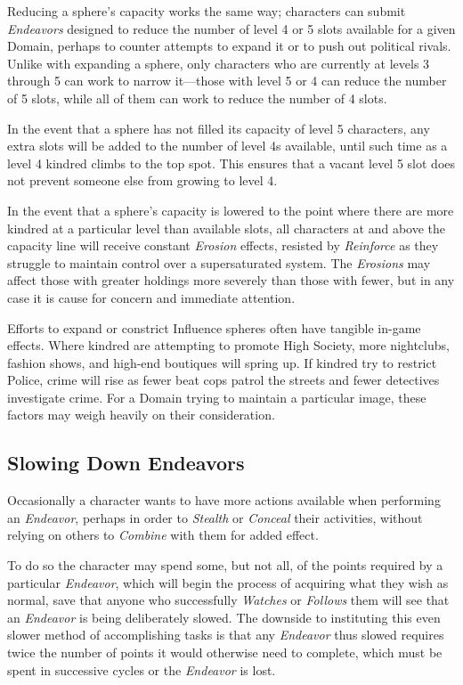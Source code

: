 Reducing a sphere's capacity works the same way; characters can submit \emph{Endeavors} designed to reduce the 
number of level 4 or 5 slots available for a given Domain, perhaps to counter attempts to expand it or to push out 
political rivals.  Unlike with expanding a sphere, only characters who are currently at levels 3 through 5 can work 
to narrow it---those with level 5 or 4 can reduce the number of 5 slots, while all of them can work to reduce the 
number of 4 slots.

In the event that a sphere has not filled its capacity of level 5 characters, any extra slots will be added to the number 
of level 4s available, until such time as a level 4 kindred climbs to the top spot.  This ensures that a vacant level 5 
slot does not prevent someone else from growing to level 4.

In the event that a sphere's capacity is lowered to the point where there are more kindred at a particular level than 
available slots, all characters at and above the capacity line will receive constant \emph{Erosion} effects, resisted 
by \emph{Reinforce} as they struggle to maintain control over a supersaturated system.  The \emph{Erosions} may affect 
those with greater holdings more severely than those with fewer, but in any case it is cause for concern and immediate 
attention.

Efforts to expand or constrict Influence spheres often have tangible in-game effects.  Where kindred are attempting 
to promote High Society, more nightclubs, fashion shows, and high-end boutiques will spring up.  If kindred try to 
restrict Police, crime will rise as fewer beat cops patrol the streets and fewer detectives investigate crime.  For a 
Domain trying to maintain a particular image, these factors may weigh heavily on their consideration.

\subsection{Slowing Down Endeavors}
Occasionally a character wants to have more actions available when performing an \emph{Endeavor}, perhaps in 
order to \emph{Stealth} or \emph{Conceal} their activities, without relying on others to \emph{Combine} with them 
for added effect.

To do so the character may spend some, but not all, of the points required by a particular \emph{Endeavor}, which 
will begin the process of acquiring what they wish as normal, save that anyone who successfully \emph{Watches} or 
\emph{Follows} them will see that an \emph{Endeavor} is being deliberately slowed.  The downside to instituting 
this even slower method of accomplishing tasks is that any \emph{Endeavor} thus slowed requires twice the number 
of points it would otherwise need to complete, which must be spent in successive cycles or the \emph{Endeavor} is 
lost. \\

